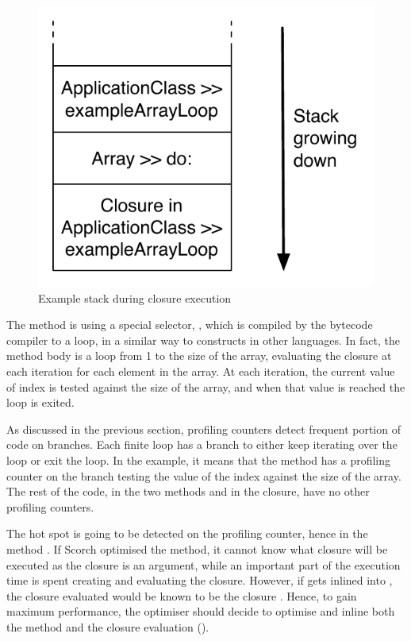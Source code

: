 \documentclass[a4paper,12pt,twoside]{../includes/ThesisStyle}
\begin{document}
\begin{figure}[h!]
    \begin{center}
        \includegraphics[width=0.42\linewidth]{ExampleLoopStack}
        \caption{Example stack during closure execution}
        \label{fig:ExampleLoopStack}
    \end{center}
\end{figure}

The method  is using a special selector, , which is compiled by the bytecode compiler to a loop, in a similar way to  constructs in other languages. In fact, the  method body is a loop from 1 to the size of the array, evaluating the closure at each iteration for each element in the array. At each iteration, the current value of index is tested against the size of the array, and when that value is reached the loop is exited.

As discussed in the previous section, profiling counters detect frequent portion of code on branches. Each finite loop has a branch to either keep iterating over the loop or exit the loop. In the example, it means that the method  has a profiling counter on the branch testing the value of the index against the size of the array. The rest of the code, in the two methods and in the closure, have no other profiling counters.

The hot spot is going to be detected on the profiling counter, hence in the method . If Scorch optimised the  method, it cannot know what closure will be executed as the closure is an argument, while an important part of the execution time is spent creating and evaluating the closure. However, if  gets inlined into , the closure evaluated would be known to be the closure . Hence, to gain maximum performance, the optimiser should decide to optimise  and inline both the  method and the closure evaluation (). 
\end{document}
